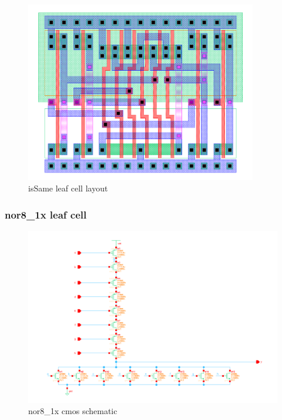 \documentclass[]{article}
\begin{document}
\begin{figure}[H]
\centering
\includegraphics[width=0.9\textwidth]{isSame-layout}
\caption{isSame leaf cell layout}
\label{fig:isSame-layout}
\end{figure}

\subsubsection{nor8\_1x leaf cell}
\begin{figure}[H]
\centering
\includegraphics[width=.9\textwidth]{nor8_1x-cmos_sch}
\caption{nor8\_1x cmos schematic}
\label{fig:nor8-schematic}
\end{figure}
\end{document}
